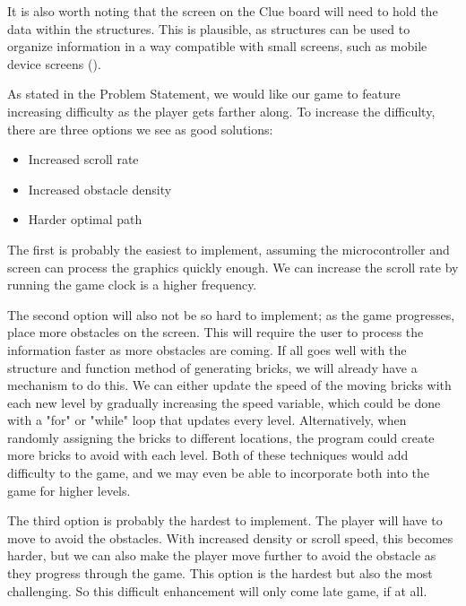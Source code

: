 \documentclass[12pt]{article}
\begin{document}
It is also worth noting that the screen on the Clue board will need to hold the data within the structures. This is plausible, as structures can be used to organize information in a way compatible with small screens, such as mobile device screens (\parencite{basicgame}).



As stated in the Problem Statement, we would like our game to feature increasing difficulty as the player gets farther along. To increase the difficulty, there are three options we see as good solutions:

\begin{itemize}
    \item Increased scroll rate
    \item Increased obstacle density
    \item Harder optimal path
\end{itemize}

The first is probably the easiest to implement, assuming the microcontroller and screen can process the graphics quickly enough. We can increase the scroll rate by running the game clock is a higher frequency. 

The second option will also not be so hard to implement; as the game progresses, place more obstacles on the screen. This will require the user to process the information faster as more obstacles are coming. If all goes well with the structure and function method of generating bricks, we will already have a mechanism to do this. We can either update the speed of the moving bricks with each new level by gradually increasing the speed variable, which could be done with a "for" or "while" loop that updates every level. Alternatively, when randomly assigning the bricks to different locations, the program could create more bricks to avoid with each level. Both of these techniques would add difficulty to the game, and we may even be able to incorporate both into the game for higher levels.

The third option is probably the hardest to implement. The player will have to move to avoid the obstacles. With increased density or scroll speed, this becomes harder, but we can also make the player move further to avoid the obstacle as they progress through the game. This option is the hardest but also the most challenging. So this difficult enhancement will only come late game, if at all.
\end{document}

